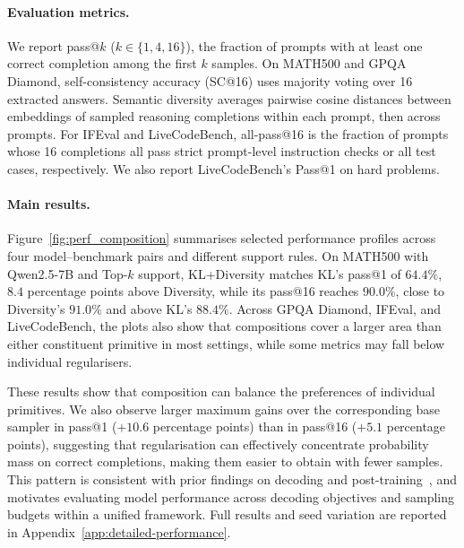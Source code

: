 \documentclass{article} %
\begin{document}
\paragraph{Evaluation metrics.}
We report pass@$k$ ($k\in\{1,4,16\}$), the fraction of prompts with at least one correct completion among the first $k$ samples. On MATH500 and GPQA Diamond, self-consistency accuracy (SC@16) uses majority voting over 16 extracted answers. Semantic diversity averages pairwise cosine distances between embeddings of sampled reasoning completions within each prompt, then across prompts. For IFEval and LiveCodeBench, all-pass@16 is the fraction of prompts whose 16 completions all pass strict prompt-level instruction checks or all test cases, respectively.
We also report LiveCodeBench's Pass@1 on hard problems.

\paragraph{Main results.}
Figure~\ref{fig:perf_composition} summarises selected performance profiles across four model--benchmark pairs and different support rules.
On MATH500 with Qwen2.5-7B and Top-$k$ support, KL+Diversity matches KL's pass@1 of $64.4\%$, $8.4$ percentage points above Diversity, while its pass@16 reaches $90.0\%$, close to Diversity's $91.0\%$ and above KL's $88.4\%$.
Across GPQA Diamond, IFEval, and LiveCodeBench, the plots also show that compositions cover a larger area than either constituent primitive in most settings, while some metrics may fall below individual regularisers.

These results show that composition can balance the preferences
of individual primitives. We also observe larger maximum gains over the corresponding base sampler in pass@1 ($+10.6$ percentage points) than in pass@16 ($+5.1$ percentage points), suggesting that regularisation can effectively concentrate probability mass on correct completions, making them easier to obtain with fewer samples.
This pattern is consistent with prior findings on decoding
and post-training~\citep{wiher2022decoding,yue2025does},
and motivates evaluating model performance across decoding
objectives and sampling budgets within a unified framework.
Full results and seed variation are reported in
Appendix~\ref{app:detailed-performance}.
\end{document}
